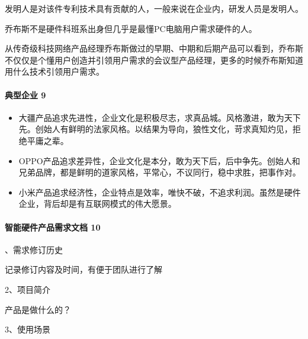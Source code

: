 \documentclass[letterpaper,10pt,english]{sphinxmanual}
\begin{document}
发明人是对该件专利技术具有贡献的人，一般来说在企业内，研发人员是发明人。

乔布斯不是硬件科班系出身但几乎是最懂PC电脑用户需求硬件的人。


从传奇级科技网络产品经理乔布斯做过的早期、中期和后期产品可以看到，乔布斯不仅仅是个懂用户创造并引领用户需求的会议型产品经理，更多的时候乔布斯知道用什么技术引领用户需求。


\paragraph{典型企业 9\sphinxfootnotemark[793]}
\label{\detokenize{chapter_project/AI_hardware:id29}}%
\begin{footnotetext}[793]\sphinxAtStartFootnote
{}
%
\end{footnotetext}\ignorespaces \begin{itemize}
\item {} 
大疆产品追求先进性，企业文化是积极尽志，求真品城。风格激进，敢为天下先。创始人有鲜明的法家风格。以结果为导向，狼性文化，苛求真知灼见，拒绝平庸之辈。

\item {} 
OPPO产品追求差异性，企业文化是本分，敢为天下后，后中争先。创始人和兄弟品牌，都是鲜明的道家风格，平常心，不议同行，稳中求胜，把事作对。

\item {} 
小米产品追求经济性，企业特点是效率，唯快不破，不追求利润。虽然是硬件企业，背后却是有互联网模式的伟大愿景。

\end{itemize}


\paragraph{智能硬件产品需求文档 10\sphinxfootnotemark[794]}
\label{\detokenize{chapter_project/AI_hardware:id30}}%
\begin{footnotetext}[794]\sphinxAtStartFootnote
{}
%
\end{footnotetext}、需求修订历史

记录修订内容及时间，有便于团队进行了解

2、项目简介

产品是做什么的？

3、使用场景
\end{document}
